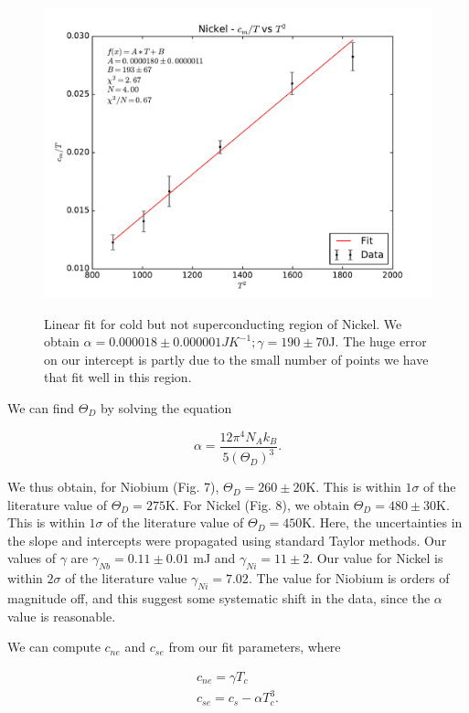 \documentclass{article}
\begin{document}
\begin{figure}[!htb]
	\centering
	\includegraphics[scale=.75]{plots/Ni_linfit.pdf}
 	\label{Nb}
	\caption{Linear fit for cold but not superconducting region of Nickel. We obtain $\alpha = 0.000018 \pm 0.000001JK^{-1}; \gamma = 190 \pm 70$J. The huge error on our intercept is partly due to the small number of points we have that fit well in this region.}
\end{figure}

We can find $\Theta_D$ by solving the equation

\begin{equation}
	\alpha = \frac{12\pi^4 N_A k_B}{5(\Theta_D)^3}.
\end{equation}

We thus obtain, for Niobium (Fig. 7), $\Theta_D = 260 \pm 20$K. This is within $1\sigma$ of the literature value of $\Theta_D = 275$K. For Nickel (Fig. 8), we obtain $\Theta_D = 480 \pm 30$K. This is within $1\sigma$ of the literature value of $\Theta_D = 450$K. Here, the uncertainties in the slope and intercepts were propagated using standard Taylor methods. Our values of $\gamma$ are $\gamma_{Nb} = 0.11 \pm 0.01$ mJ and $\gamma_{Ni} =11 \pm 2$. Our value for Nickel is within $2\sigma$ of the literature value $\gamma_{Ni} = 7.02$. The value for Niobium is orders of magnitude off, and this suggest some systematic shift in the data, since the $\alpha$ value is reasonable.
\hspace{.25cm}

We can compute $c_{ne}$ and $c_{se}$ from our fit parameters, where

\begin{gather}
	c_{ne} = \gamma T_c \\
	c_{se} = c_s - \alpha T_c^3.
\end{gather}
\end{document}
